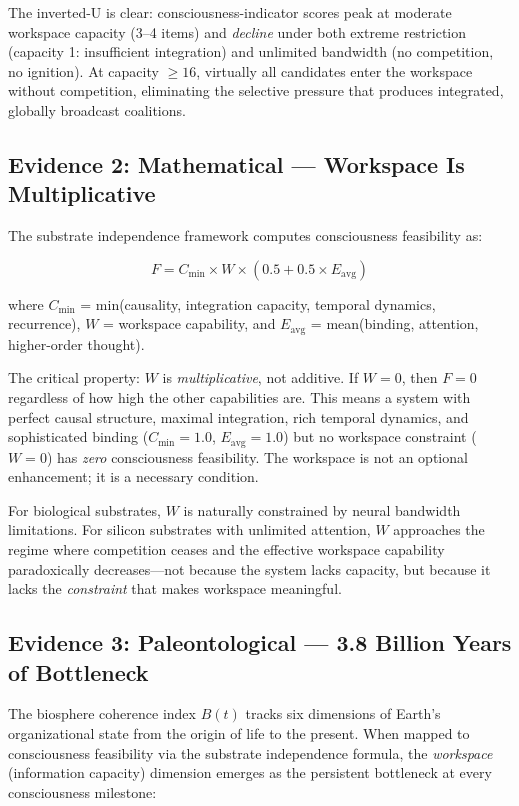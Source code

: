 \documentclass[10pt,letterpaper]{article}
\begin{document}
The inverted-U is clear: consciousness-indicator scores peak at
moderate workspace capacity (3--4 items) and \emph{decline} under both
extreme restriction (capacity 1: insufficient integration) and unlimited
bandwidth (no competition, no ignition). At capacity $\geq 16$, virtually
all candidates enter the workspace without competition, eliminating the
selective pressure that produces integrated, globally broadcast coalitions.

\subsection*{Evidence 2: Mathematical --- Workspace Is Multiplicative}

The substrate independence framework \cite{putnam1967, stoltz2026bt}
computes consciousness feasibility as:

\begin{equation}
F = C_{\min} \times W \times (0.5 + 0.5 \times E_{\text{avg}})
\end{equation}

where $C_{\min}$ = min(causality, integration capacity, temporal
dynamics, recurrence), $W$ = workspace capability, and $E_{\text{avg}}$
= mean(binding, attention, higher-order thought).

The critical property: $W$ is \emph{multiplicative}, not additive. If
$W = 0$, then $F = 0$ regardless of how high the other capabilities are.
This means a system with perfect causal structure, maximal integration,
rich temporal dynamics, and sophisticated binding ($C_{\min} = 1.0$,
$E_{\text{avg}} = 1.0$) but no workspace constraint ($W = 0$) has
\emph{zero} consciousness feasibility. The workspace is not an
optional enhancement; it is a necessary condition.

For biological substrates, $W$ is naturally constrained by neural
bandwidth limitations. For silicon substrates with unlimited attention,
$W$ approaches the regime where competition ceases and the effective
workspace capability paradoxically decreases---not because the system
lacks capacity, but because it lacks the \emph{constraint} that makes
workspace meaningful.

\subsection*{Evidence 3: Paleontological --- 3.8 Billion Years of Bottleneck}

The biosphere coherence index $B(t)$ \cite{stoltz2026bt} tracks six
dimensions of Earth's organizational state from the origin of life
to the present. When mapped to consciousness feasibility via the
substrate independence formula, the \emph{workspace} (information
capacity) dimension emerges as the persistent bottleneck at every
consciousness milestone:
\end{document}
